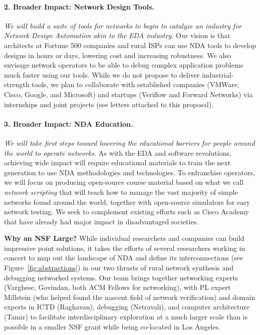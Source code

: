 \paragraph*{2. Broader Impact: Network Design Tools.}{\em We will build a suite of tools for networks to begin to catalyze an industry for Network Design Automation akin to the EDA industry.}   
%
 Our vision is that architects at Fortune 500 companies and rural ISPs  can use NDA tools to develop designs in hours or days, lowering cost and increasing robustness. We also envisage network operators to be able to debug complex application problems much faster using our tools.  While we do not propose to deliver industrial-strength tools, we plan to collaborate with established companies (VMWare, Cisco, Google, and Microsoft) and startups (Veriflow and Forward Networks) via internships and joint projects (see letters  attached to this proposal). 

\paragraph*{3. Broader Impact: NDA Education.} {\em We will take first steps toward lowering the educational barriers for people around the world to operate networks.}
%
As with the EDA and software revolutions, achieving wide impact will require educational materials to train the next generation to use NDA methodologies and technologies. To enfranchise operators, we will focus on producing open-source course material based on what we call {\em network scripting} that will teach how to manage the vast majority of simple networks found around the world, together with open-source simulators for easy network testing. We seek to complement existing efforts such as Cisco Academy~\cite{ciscoacademy} that have already had major impact in disadvantaged societies. 

{\bf Why an NSF Large?}  While individual researchers and companies can build impressive point solutions, it takes the efforts of several researchers working in concert to map out the landscape of NDA and define its interconnections (see Figure~\ref{fig:abstractions}) in our two thrusts of rural network synthesis and
debugging networked systems.  Our team brings together networking experts (Varghese, Govindan, both ACM Fellows for networking), with PL expert Millstein (who helped found the nascent field of network verification) and domain experts in ICTD (Raghavan), debugging (Netravali), and computer architecture (Tamir) to facilitate interdisciplinary exploration at a much larger scale than is possible in a smaller NSF grant while being co-located in Los Angeles. 

